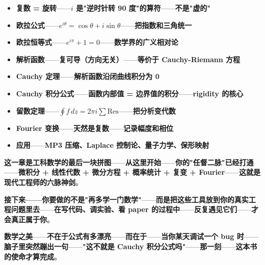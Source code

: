 \begin{tcolorbox}[essbox={本章核心}]
\begin{itemize}
\item \textbf{复数 = 旋转}——\textbf{$i$ 是"逆时针转 90 度"的算符}——\textbf{不是"虚的"}
\item \textbf{欧拉公式}——\textbf{$e^{i\theta} = \cos\theta + i\sin\theta$}——\textbf{把指数和三角统一}
\item \textbf{欧拉恒等式}——\textbf{$e^{i\pi} + 1 = 0$}——\textbf{数学界的广义相对论}
\item \textbf{解析函数}——\textbf{复可导（方向无关）}——\textbf{等价于 Cauchy-Riemann 方程}
\item \textbf{Cauchy 定理}——\textbf{解析函数沿闭曲线积分为 0}
\item \textbf{Cauchy 积分公式}——\textbf{函数内部值 = 边界值的积分}——\textbf{rigidity 的核心}
\item \textbf{留数定理}——\textbf{$\oint f\,dz = 2\pi i \sum \text{Res}$}——\textbf{把分析变代数}
\item \textbf{Fourier 变换}——\textbf{天然是复数}——\textbf{记录幅度和相位}
\item \textbf{应用}——\textbf{MP3 压缩、Laplace 控制论、量子力学、保形映射}
\end{itemize}
\end{tcolorbox}

\textbf{这一章是\textbf{工科数学的最后一块拼图}}——\textbf{从这里开始}——\textbf{你的"任督二脉"已经打通}——\textbf{微积分 + 线性代数 + 微分方程 + 概率统计 + 复变 + Fourier}——\textbf{这就是现代工程师的\textbf{六脉神剑}}。

\textbf{接下来——你要做的不是"再多学一门数学"}——\textbf{而是\textbf{把这些工具放到你的真实工程问题里去}}——\textbf{在写代码、调实验、看 paper 的过程中}——\textbf{反复\textbf{遇见它们}}——\textbf{才会真正\textbf{属于你}}。

\textbf{数学之美}——\textbf{不在于公式有多漂亮}——\textbf{而在于}——\textbf{当你某天调试一个 bug 时}——\textbf{脑子里突然蹦出一句}——\textbf{"这不就是 Cauchy 积分公式吗"}——\textbf{那一刻}——\textbf{这本书的使命才算完成}。

\clearpage
